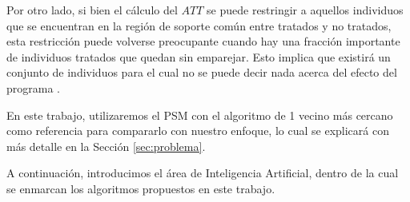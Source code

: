 \documentclass[../../main.tex]{subfiles}
\begin{document}
Por otro lado, si bien el cálculo del \(ATT\) se puede restringir a aquellos individuos
que se encuentran en la región de soporte común entre tratados y no tratados, esta
restricción puede volverse preocupante cuando hay una fracción importante de individuos
tratados que quedan sin emparejar. Esto implica que existirá un conjunto de individuos
para el cual no se puede decir nada acerca del efecto del programa \cite{bernal}.

\bigskip
En este trabajo, utilizaremos el PSM con el algoritmo de 1 vecino más cercano como
referencia para compararlo con nuestro enfoque, lo cual se explicará con más detalle en la
Sección \ref{sec:problema}.

A continuación, introducimos el área de Inteligencia Artificial, dentro de la cual se
enmarcan los algoritmos propuestos en este trabajo.
\end{document}
